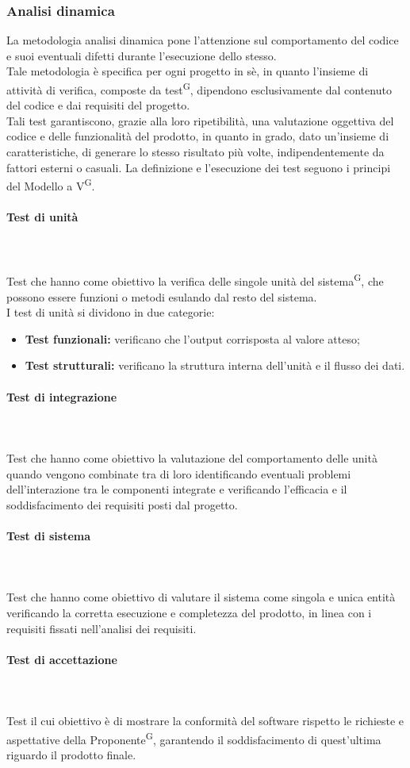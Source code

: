 \documentclass[8pt]{article}
\newcommand{\glossterm}[1]{#1\textsuperscript{G}} %
\newcommand{\subsubsubsection}[1]{\paragraph{#1}\mbox{}\\}
\begin{document}
\subsubsection{Analisi dinamica}
La metodologia analisi dinamica pone l'attenzione sul comportamento del codice e suoi eventuali difetti durante l'esecuzione dello stesso. \\
Tale metodologia è specifica per ogni progetto in sè, in quanto l'insieme di attività di verifica, composte da \glossterm{test}, dipendono esclusivamente dal contenuto del codice e dai requisiti del progetto. \\
Tali test garantiscono, grazie alla loro ripetibilità, una valutazione oggettiva del codice e delle funzionalità del prodotto, in quanto in grado, dato un'insieme di caratteristiche, di generare lo stesso risultato più volte, indipendentemente da fattori esterni o casuali.
La definizione e l'esecuzione dei test seguono i principi del \glossterm{Modello a V}.
\subsubsubsection{Test di unità} \\
Test che hanno come obiettivo la verifica delle singole unità del \glossterm{sistema}, che possono essere funzioni o metodi esulando dal resto del sistema. \\
I test di unità si dividono in due categorie:
\begin{itemize}
    \item \textbf{Test funzionali:} verificano che l'output corrisposta al valore atteso;
    \item \textbf{Test strutturali:} verificano la struttura interna dell'unità e il flusso dei dati.
\end{itemize}

\subsubsubsection{Test di integrazione} \\
Test che hanno come obiettivo la valutazione del comportamento delle unità quando vengono combinate tra di loro identificando eventuali problemi dell'interazione tra le componenti integrate e verificando l'efficacia e il soddisfacimento dei requisiti posti dal progetto.

\subsubsubsection{Test di sistema} \\
Test che hanno come obiettivo di valutare il sistema come singola e unica entità verificando la corretta esecuzione e completezza del prodotto, in linea con i requisiti fissati nell'analisi dei requisiti.

\subsubsubsection{Test di accettazione} \\
Test il cui obiettivo è di mostrare la conformità del software rispetto le richieste e aspettative della \glossterm{Proponente}, garantendo il soddisfacimento di quest'ultima riguardo il prodotto finale.
\end{document}
